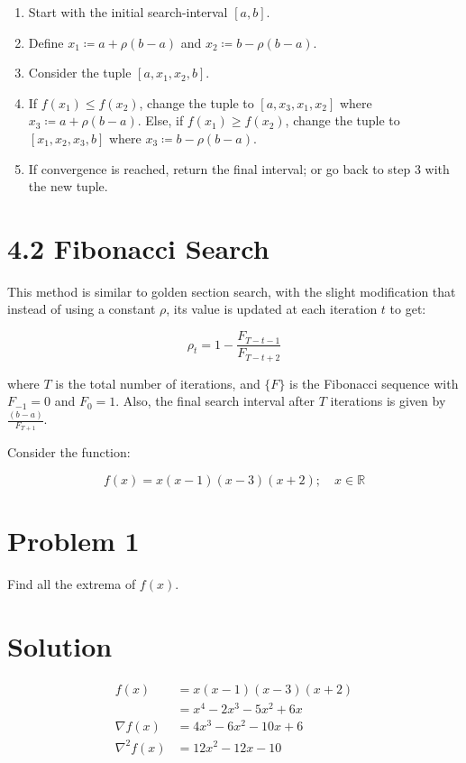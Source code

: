 \documentclass{article}
\begin{document}
\begin{enumerate}
    \item Start with the initial search-interval $[a, b]$.
    \item Define $x_1 \coloneqq a + \rho(b - a)$ and $x_2 \coloneqq b - \rho(b - a)$.
    \item Consider the tuple $[a, x_1, x_2, b]$.
    \item If $f(x_1) \leq f(x_2)$, change the tuple to $[a, x_3, x_1, x_2]$ where $x_3 \coloneqq a + \rho(b - a)$. Else, if $f(x_1) \geq f(x_2)$, change the tuple to $[x_1, x_2, x_3, b]$ where $x_3 \coloneqq b - \rho(b - a)$.
    \item If convergence is reached, return the final interval; or go back to step 3 with the new tuple.
\end{enumerate}

\section*{4.2 Fibonacci Search}

This method is similar to golden section search, with the slight modification that instead of using a constant $\rho$, its value is updated at each iteration $t$ to get:

$$\rho_t = 1 - \frac{F_{T - t - 1}}{F_{T - t + 2}}$$

where $T$ is the total number of iterations, and $\{F\}$ is the Fibonacci sequence with $F_{-1} = 0$ and $F_0 = 1$. Also, the final search interval after $T$ iterations is given by $\frac{(b - a)}{F_{T + 1}}$. 

Consider the function:

$$f(x) = x(x - 1)(x - 3)(x + 2); \quad x \in \mathbb{R}$$

\section*{Problem 1}

Find all the extrema of $f(x)$.

\section*{Solution}

\begin{align*}
    f(x) &= x(x - 1)(x - 3)(x + 2) \\
    &= x^4 - 2x^3 - 5x^2 + 6x \\
    \nabla f(x) &= 4x^3 - 6x^2 - 10x + 6\\
    \nabla^2 f(x) &= 12x^2 - 12x - 10
\end{align*}
\end{document}
